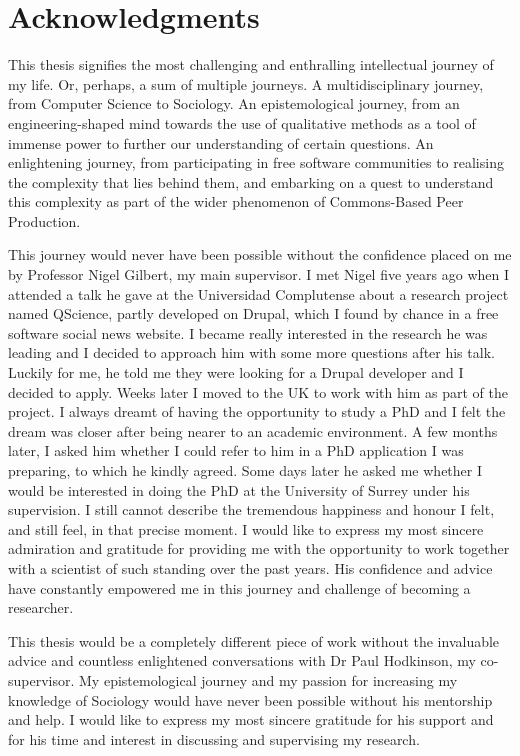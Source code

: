 \section*{Acknowledgments}

This thesis signifies the most challenging and enthralling intellectual journey of my life. Or, perhaps, a sum of multiple journeys. A multidisciplinary journey, from Computer Science to Sociology. An epistemological journey, from an engineering-shaped mind towards the use of qualitative methods as a tool of immense power to further our understanding of certain questions. An enlightening journey, from participating in free software communities to realising the complexity that lies behind them, and embarking on a quest to understand this complexity as part of the wider phenomenon of Commons-Based Peer Production.  

This journey would never have been possible without the confidence placed on me by Professor Nigel Gilbert, my main supervisor. I met Nigel five years ago when I attended a talk he gave at the Universidad Complutense about a research project named QScience, partly developed on Drupal, which I found by chance in a free software social news website. I became really interested in the research he was leading and I decided to approach him with some more questions after his talk. Luckily for me, he told me they were looking for a Drupal developer and I decided to apply. Weeks later I moved to the UK to work with him as part of the project. I always dreamt of having the opportunity to study a PhD and I felt the dream was closer after being nearer to an academic environment. A few months later, I asked him whether I could refer to him in a PhD application I was preparing, to which he kindly agreed. Some days later he asked me whether I would be interested in doing the PhD at the University of Surrey under his supervision. I still cannot describe the tremendous happiness and honour I felt, and still feel, in that precise moment. I would like to express my most sincere admiration and gratitude for providing me with the opportunity to work together with a scientist of such standing over the past years. His confidence and advice have constantly empowered me in this journey and challenge of becoming a researcher.

This thesis would be a completely different piece of work without the invaluable advice and countless enlightened conversations with Dr Paul Hodkinson, my co-supervisor. My epistemological journey and my passion for increasing my knowledge of Sociology would have never been possible without his mentorship and help. I would like to express my most sincere gratitude for his support and for his time and interest in discussing and supervising my research. 

